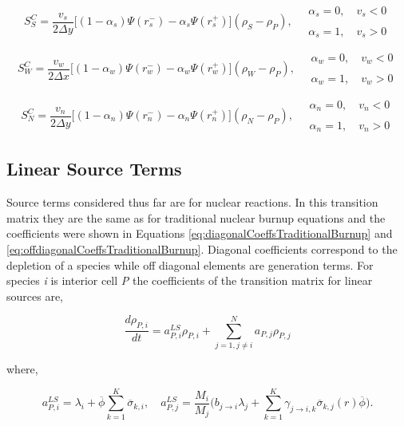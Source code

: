\begin{equation*}
    S^{C}_{S} = \frac{v_{s}}{2\Delta y}\bigg[(1-\alpha_{s})\Psi(r_{s}^{-}) - \alpha_{s}\Psi(r_{s}^{+})\bigg](\rho_{S} - \rho_{P}), \quad \substack{\alpha_{s} = 0, \quad v_{s} < 0\\
    \\
    \alpha_{s} = 1, \quad v_{s} > 0}
\end{equation*}

\begin{equation*}
    S^{C}_{W} = \frac{v_{w}}{2\Delta x}\bigg[(1-\alpha_{w})\Psi(r_{w}^{-}) - \alpha_{w}\Psi(r_{w}^{+})\bigg](\rho_{W} - \rho_{P}), \quad \substack{\alpha_{w} = 0, \quad v_{w} < 0\\
    \\
    \alpha_{w} = 1, \quad v_{w} > 0}
\end{equation*}

\begin{equation*}
    S^{C}_{N} = \frac{v_{n}}{2\Delta y}\bigg[(1-\alpha_{n})\Psi(r_{n}^{-}) - \alpha_{n}\Psi(r_{n}^{+})\bigg](\rho_{N} - \rho_{P}), \quad \substack{\alpha_{n} = 0, \quad v_{n} < 0\\
    \\
    \alpha_{n} = 1, \quad v_{n} > 0}
\end{equation*}



\subsection{Linear Source Terms}
Source terms considered thus far are for nuclear reactions. In this transition matrix they are the same as for traditional nuclear burnup equations and the coefficients were shown in Equations \ref{eq:diagonalCoeffsTraditionalBurnup} and \ref{eq:offdiagonalCoeffsTraditionalBurnup}. Diagonal coefficients correspond to the depletion of a species while off diagonal elements are generation terms. For species \textit{i} is interior cell \textit{P} the coefficients of the transition matrix for linear sources are,

\begin{equation}
    \frac{d \rho_{P,i}}{dt} = a_{P,i}^{LS}\rho_{P,i} + \sum_{j=1, j \neq i}^{N}a_{P,j}\rho_{P, j}
\end{equation}

\noindent where,

\begin{equation*}
    a^{LS}_{P,i} = \lambda_{i} + \overline{\phi}\sum_{k=1}^{K} \overline{\sigma}_{k,i}, \quad 
    a^{LS}_{P,j} = \frac{M_{i}}{M_{j}}\bigg(b_{j\rightarrow i}\lambda_{j} +
    \sum_{k=1}^{K}\gamma_{j\rightarrow i,k}\overline{\sigma}_{k,j}(r)\overline{\phi} \bigg).
\end{equation*}

